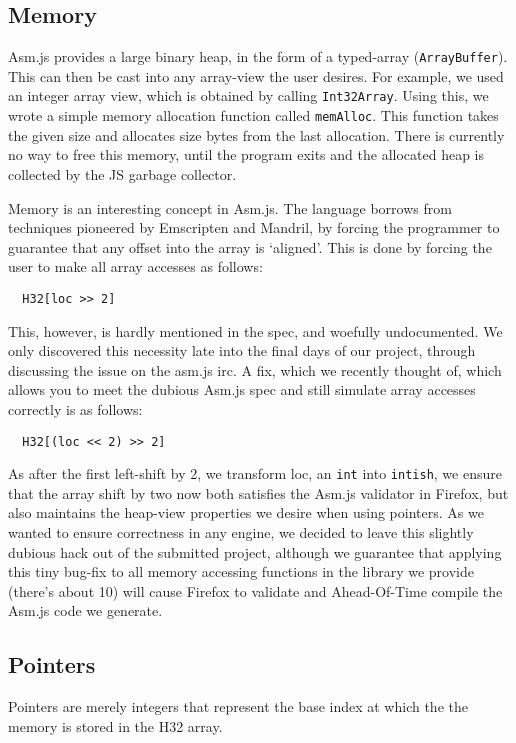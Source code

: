 \documentclass[twoside]{article}
\begin{document}
\begin{multicols}{2}
  \subsection{Memory}
    Asm.js provides a large binary heap, in the form of a typed-array (\texttt{ArrayBuffer}). 
    This can then be cast into any array-view the user desires. For example, we used an integer array view,
    which is obtained by calling \verb+Int32Array+. Using this, we
    wrote a simple memory allocation function called \texttt{memAlloc}. This function takes the given
    size and allocates size bytes from the last allocation. There is currently no way to
    free this memory, until the program exits and the allocated heap is collected by the JS 
    garbage collector. 

    Memory is an interesting concept in Asm.js. The language borrows from techniques pioneered by 
    Emscripten and Mandril, by forcing the programmer to guarantee that any offset into the array
    is `aligned'. This is done by forcing the user to make all array accesses as follows:
\begin{verbatim}
  H32[loc >> 2]
\end{verbatim}
    This, however, is hardly mentioned in the spec, and woefully undocumented. We only discovered
    this necessity late into the final days of our project, through discussing the issue on the
    asm.js irc. A fix, which we recently thought of, which allows you to meet the dubious Asm.js 
    spec and still simulate array accesses correctly is as follows: 
\begin{verbatim}
  H32[(loc << 2) >> 2]
\end{verbatim}
    As after the first left-shift by 2, we transform loc, an \texttt{int} into \texttt{intish}, 
    we ensure that the array shift by two now both satisfies the Asm.js validator in Firefox,
    but also maintains the heap-view properties we desire when using pointers. As we wanted
    to ensure correctness in any engine, we decided to leave this slightly dubious hack out
    of the submitted project, although we guarantee that applying this tiny bug-fix to all
    memory accessing functions in the library we provide (there's about 10) will cause Firefox
    to validate and Ahead-Of-Time compile the Asm.js code we generate. 

  \subsection{Pointers}
    Pointers are merely integers that represent the base index at which the
    the memory is stored in the H32 array.


\end{multicols}
\end{document}

